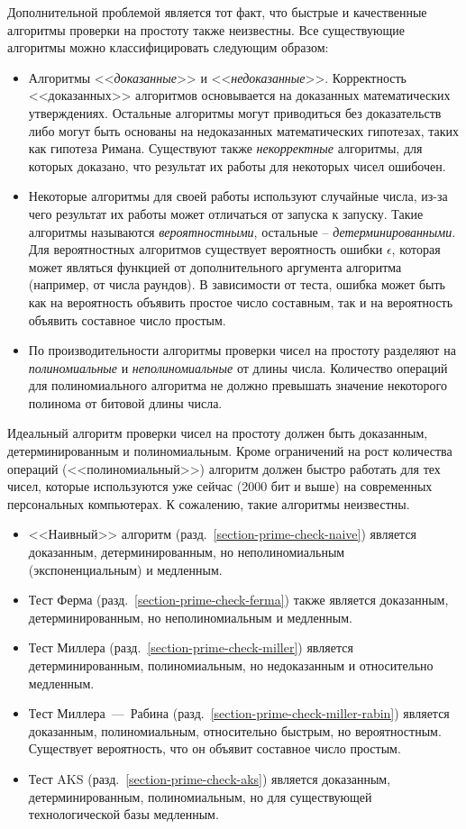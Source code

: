 Дополнительной проблемой является тот факт, что быстрые и качественные алгоритмы проверки на простоту также неизвестны. Все существующие алгоритмы можно классифицировать следующим образом:
\begin{itemize}
	\item Алгоритмы <<\emph{доказанные}>> и <<\emph{недоказанные}>>. Корректность <<доказанных>> алгоритмов основывается на доказанных математических утверждениях. Остальные алгоритмы могут приводиться без доказательств либо могут быть основаны на недоказанных математических гипотезах, таких как гипотеза Римана. Существуют также \emph{некорректные} алгоритмы, для которых доказано, что результат их работы для некоторых чисел ошибочен.
	\item Некоторые алгоритмы для своей работы используют случайные числа, из-за чего результат их работы может отличаться от запуска к запуску. Такие алгоритмы называются \emph{вероятностными}, остальные -- \emph{детерминированными}. Для вероятностных алгоритмов существует вероятность ошибки $\epsilon$, которая может являться функцией от дополнительного аргумента алгоритма (например, от числа раундов). В зависимости от теста, ошибка может быть как на вероятность объявить простое число составным, так и на вероятность объявить составное число простым.
	\item По производительности алгоритмы проверки чисел на простоту разделяют на \emph{полиномиальные} и \emph{неполиномиальные} от длины числа. Количество операций для полиномиального алгоритма не должно превышать значение некоторого полинома от битовой длины числа.
\end{itemize}

Идеальный алгоритм проверки чисел на простоту должен быть доказанным, детерминированным и полиномиальным. Кроме ограничений на рост количества операций (<<полиномиальный>>) алгоритм должен быстро работать для тех чисел, которые используются уже сейчас (2000 бит и выше) на современных персональных компьютерах. К сожалению, такие алгоритмы неизвестны.

\begin{itemize}
	\item <<Наивный>> алгоритм (разд.~\ref{section-prime-check-naive}) является доказанным, детерминированным, но неполиномиальным (экспоненциальным) и медленным.
	\item Тест Ферма (разд.~\ref{section-prime-check-ferma}) также является доказанным, детерминированным, но неполиномиальным и медленным.
	\item Тест Миллера (разд.~\ref{section-prime-check-miller}) является детерминированным, полиномиальным, но недоказанным и относительно медленным.
	\item Тест Миллера~---~Рабина (разд.~\ref{section-prime-check-miller-rabin}) является доказанным, полиномиальным, относительно быстрым, но вероятностным. Существует вероятность, что он объявит составное число простым.
	\item Тест AKS (разд.~\ref{section-prime-check-aks}) является доказанным, детерминированным, полиномиальным, но для существующей технологической базы медленным.
\end{itemize}

